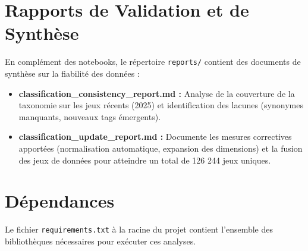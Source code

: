 \documentclass{article}
\begin{document}
\section{Rapports de Validation et de Synthèse}

En complément des notebooks, le répertoire \texttt{reports/} contient des documents de synthèse sur la fiabilité des données :

\begin{itemize}
    \item \textbf{classification\_consistency\_report.md :} Analyse de la couverture de la taxonomie sur les jeux récents (2025) et identification des lacunes (synonymes manquants, nouveaux tags émergents).
    \item \textbf{classification\_update\_report.md :} Documente les mesures correctives apportées (normalisation automatique, expansion des dimensions) et la fusion des jeux de données pour atteindre un total de 126 244 jeux uniques.
\end{itemize}

\section{Dépendances}
Le fichier 	\texttt{requirements.txt} à la racine du projet contient l'ensemble des bibliothèques nécessaires pour exécuter ces analyses.
\end{document}
